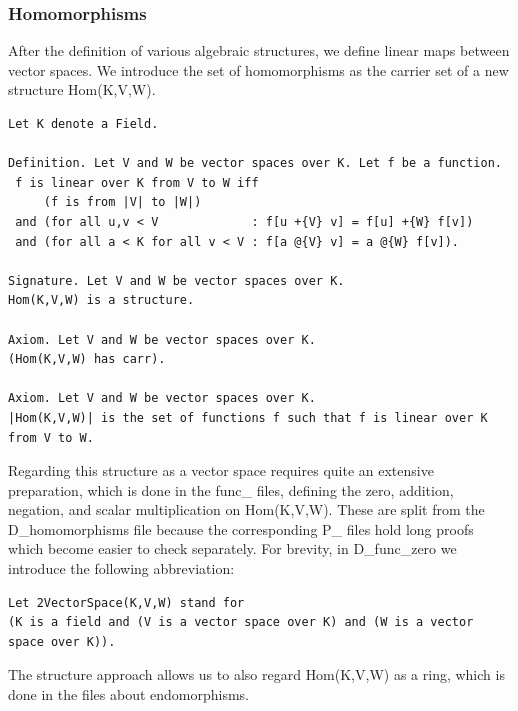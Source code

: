 \documentclass[11pt]{article}
\begin{document}
\subsubsection{Homomorphisms}
After the definition of various algebraic structures, we define linear maps between vector spaces.
We introduce the set of homomorphisms as the carrier set of a new structure {\ftl Hom(K,V,W)}.
\begin{lstlisting}
Let K denote a Field.

Definition. Let V and W be vector spaces over K. Let f be a function.
 f is linear over K from V to W iff
     (f is from |V| to |W|)
 and (for all u,v < V             : f[u +{V} v] = f[u] +{W} f[v])
 and (for all a < K for all v < V : f[a @{V} v] = a @{W} f[v]).

Signature. Let V and W be vector spaces over K.
Hom(K,V,W) is a structure.

Axiom. Let V and W be vector spaces over K.
(Hom(K,V,W) has carr).

Axiom. Let V and W be vector spaces over K.
|Hom(K,V,W)| is the set of functions f such that f is linear over K from V to W.
\end{lstlisting}

Regarding this structure as a vector space requires quite an extensive preparation, which is done in the func\_ files, defining the zero, addition, negation, and scalar multiplication on {\ftl Hom(K,V,W)}. These are split from the D\_homomorphisms file because the corresponding P\_ files hold long proofs which become easier to check separately.
For brevity, in D\_func\_zero we introduce the following abbreviation:
\begin{lstlisting}
Let 2VectorSpace(K,V,W) stand for
(K is a field and (V is a vector space over K) and (W is a vector space over K)).
\end{lstlisting}

The {\ftl structure} approach allows us to also regard {\ftl Hom(K,V,W)} as a ring, which is done in the files about endomorphisms.
\end{document}
